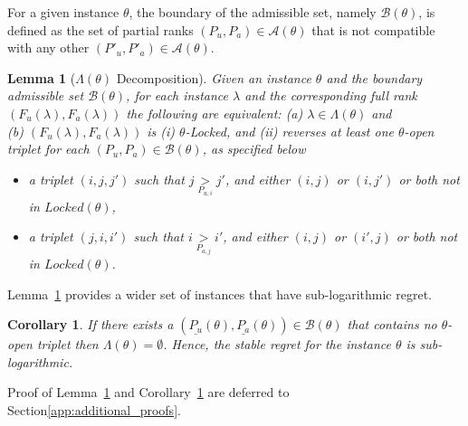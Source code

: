 \documentclass{article}
\newtheorem{corollary}{Corollary}[theorem]
\newtheorem{lemma}[theorem]{Lemma}
\begin{document}
For a given instance $\theta$, the boundary of the admissible set, namely $\mathcal{B}(\theta)$, is defined as the set of partial ranks $(P_u, P_a)\in \mathcal{A}(\theta)$ that is not compatible with any other $(P'_u, P'_a)\in \mathcal{A}(\theta)$. 

\begin{lemma}[$\Lambda(\theta)$ Decomposition]\label{lemm:lambda_decomp}
Given an instance $\theta$ and the boundary admissible set $\mathcal{B}(\theta)$, for each instance $\lambda$ and the corresponding full rank $(F_u(\lambda), F_a(\lambda))$ the following are equivalent:
(a) $\lambda \in \Lambda(\theta)$ and \\
(b) $(F_u(\lambda), F_a(\lambda))$ is  (i) $\theta$-Locked, and  (ii) reverses at least one {\em $\theta$-open triplet} for each $(P_u, P_a) \in \mathcal{B}(\theta)$, as specified below  
\begin{itemize}[leftmargin=*, noitemsep]
    \item a triplet $(i,j, j')$ such that $j \underset{P_{u,i}}{>} j'$, and either $(i,j)$ or $(i, j')$ or both not in $Locked(\theta)$, 
    \item a triplet $(j,i,i')$ such that $i \underset{P_{a,j}}{>} i'$, and either $(i,j)$ or $(i', j)$ or both not in $Locked(\theta)$.
\end{itemize}
\end{lemma}

Lemma~\ref{lemm:lambda_decomp} provides a wider set of instances that have sub-logarithmic regret.
\begin{corollary}\label{corr:wide_sub_log}
If there exists a $(\underline{P_u}(\theta), \underline{P_a}(\theta)) \in \mathcal{B}(\theta)$ that contains no $\theta$-open triplet then $\Lambda(\theta) = \emptyset$. Hence, the stable regret for the instance $\theta$ is sub-logarithmic.
\end{corollary}

Proof of Lemma~\ref{lemm:lambda_decomp} and Corollary~\ref{corr:wide_sub_log} are deferred to Section\ref{app:additional_proofs}.
\end{document}
